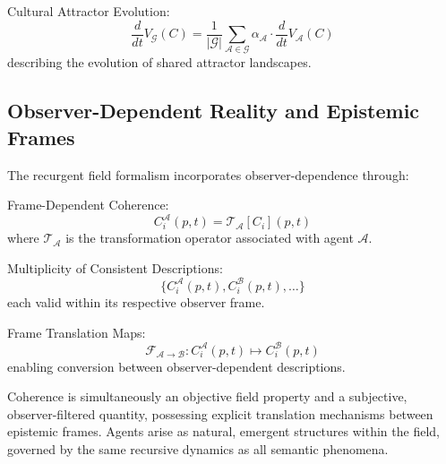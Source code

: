 Cultural Attractor Evolution:
\begin{equation}
\frac{d}{dt}V_{\mathcal{G}}(C) = \frac{1}{|\mathcal{G}|}\sum_{\mathcal{A} \in \mathcal{G}} \alpha_{\mathcal{A}} \cdot \frac{d}{dt}V_{\mathcal{A}}(C)
\end{equation}
describing the evolution of shared attractor landscapes.

\subsection{Observer-Dependent Reality and Epistemic Frames}

The recurgent field formalism incorporates observer-dependence through:

Frame-Dependent Coherence:
\begin{equation}
C_i^{\mathcal{A}}(p,t) = \mathcal{T}_{\mathcal{A}}[C_i](p,t)
\end{equation}
where \(\mathcal{T}_{\mathcal{A}}\) is the transformation operator associated with agent \(\mathcal{A}\).

Multiplicity of Consistent Descriptions:
\begin{equation}
\{C_i^{\mathcal{A}}(p,t), C_i^{\mathcal{B}}(p,t), \ldots\}
\end{equation}
each valid within its respective observer frame.

Frame Translation Maps:
\begin{equation}
\mathcal{F}_{\mathcal{A} \to \mathcal{B}} : C_i^{\mathcal{A}}(p,t) \mapsto C_i^{\mathcal{B}}(p,t)
\end{equation}
enabling conversion between observer-dependent descriptions.

Coherence is simultaneously an objective field property and a subjective, observer-filtered quantity, possessing explicit translation mechanisms between epistemic frames. Agents arise as natural, emergent structures within the field, governed by the same recursive dynamics as all semantic phenomena.